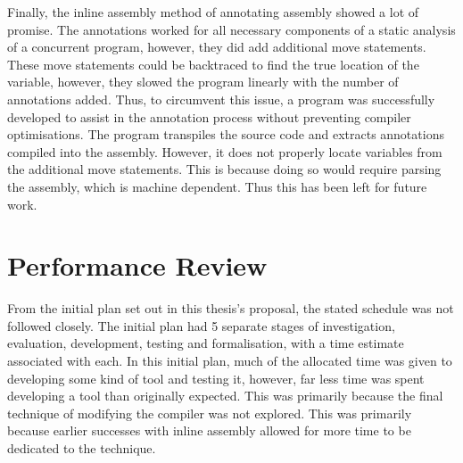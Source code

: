 Finally, the inline assembly method of annotating assembly showed a lot of promise. The annotations worked for all necessary components of a static analysis of a concurrent program, however, they did add additional move statements. These move statements could be backtraced to find the true location of the variable, however, they slowed the program linearly with the number of annotations added. Thus, to circumvent this issue, a program was successfully developed to assist in the annotation process without preventing compiler optimisations. The program transpiles the source code and extracts annotations compiled into the assembly. However, it does not properly locate variables from the additional move statements. This is because doing so would require parsing the assembly, which is machine dependent. Thus this has been left for future work.

\section{Performance Review}
From the initial plan set out in this thesis's proposal, the stated schedule was not followed closely. The initial plan had 5 separate stages of investigation, evaluation, development, testing and formalisation, with a time estimate associated with each. In this initial plan, much of the allocated time was given to developing some kind of tool and testing it, however, far less time was spent developing a tool than originally expected. This was primarily because the final technique of modifying the compiler was not explored. This was primarily because earlier successes with inline assembly allowed for more time to be dedicated to the technique. 







